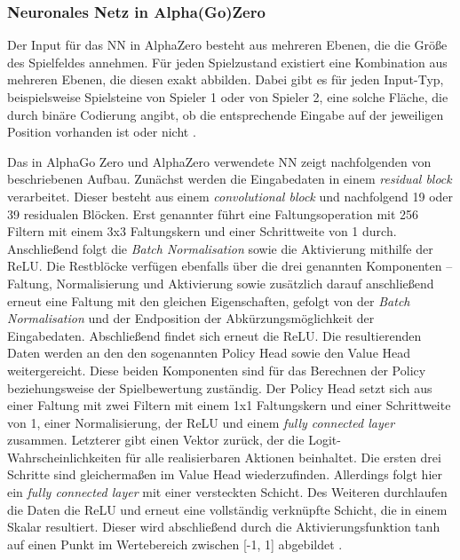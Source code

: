 \documentclass[12pt,a4paper]{article}
\begin{document}
\subsubsection{Neuronales Netz in Alpha(Go)Zero}
\label{secNNAZ}
Der Input für das NN in AlphaZero besteht aus mehreren Ebenen, die die Größe des Spielfeldes annehmen. Für jeden Spielzustand existiert eine Kombination aus mehreren Ebenen, die diesen exakt abbilden. Dabei gibt es für jeden Input-Typ, beispielsweise Spielsteine von Spieler 1 oder von Spieler 2, eine solche Fläche, die durch binäre Codierung angibt, ob die entsprechende Eingabe auf der jeweiligen Position vorhanden ist oder nicht \cite{SilverHubert2017}.

Das in AlphaGo Zero und AlphaZero verwendete NN zeigt nachfolgenden von \cite{Silver2017} beschriebenen Aufbau.
Zunächst werden die Eingabedaten in einem \textit{residual block} verarbeitet. Dieser besteht aus einem \textit{convolutional block} und nachfolgend 19 oder 39 residualen Blöcken. Erst genannter führt eine Faltungsoperation mit 256 Filtern mit einem 3x3 Faltungskern und einer Schrittweite von 1 durch. Anschließend folgt die \textit{Batch Normalisation} sowie die Aktivierung mithilfe der ReLU. Die Restblöcke verfügen ebenfalls über die drei genannten Komponenten – Faltung, Normalisierung und Aktivierung sowie zusätzlich darauf anschließend erneut eine Faltung mit den gleichen Eigenschaften, gefolgt von der \textit{Batch Normalisation} und der Endposition der Abkürzungsmöglichkeit der Eingabedaten. Abschließend findet sich erneut die ReLU.
Die resultierenden Daten werden an den den sogenannten \glqq{}Policy Head\grqq{} sowie den \glqq{}Value Head\grqq{} weitergereicht. Diese beiden Komponenten sind für das Berechnen der Policy beziehungsweise der Spielbewertung zuständig. Der Policy Head setzt sich aus einer Faltung mit zwei Filtern mit einem 1x1 Faltungskern und einer Schrittweite von 1, einer Normalisierung, der ReLU und einem \textit{fully connected layer} zusammen. Letzterer gibt einen Vektor zurück, der die Logit-Wahrscheinlichkeiten für alle realisierbaren Aktionen beinhaltet.
Die ersten drei Schritte sind gleichermaßen im Value Head wiederzufinden. Allerdings folgt hier ein \textit{fully connected layer} mit einer versteckten Schicht. Des Weiteren durchlaufen die Daten die ReLU und erneut eine vollständig verknüpfte Schicht, die in einem Skalar resultiert. Dieser wird abschließend durch die Aktivierungsfunktion tanh auf einen Punkt im Wertebereich zwischen [-1, 1] abgebildet \cite{Silver2017}.
\end{document}
